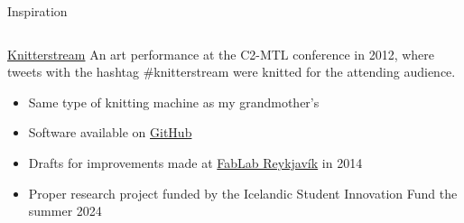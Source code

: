 \documentclass[
    NAME={Dr. Helga Ingimundardóttir},
    EMAIL={helgaingim@hi.is},
    FACULTY={Industrial Engineering},
    TITLE={HiDef Textiles: Reviving Tradition with Innovation},
    SUBTITLE={Empowering Creativity and Sustainability in Textile Production through Digital Transformation},
    SEMINAR={Reykjavík DataBeers},
    DATE={January 25, 2025},
    WIDE={true}
]{HI-LaTeX/hi-beamer}
\begin{document}
\begin{frame}{Inspiration}

\begin{columns}
    \begin{column}{0.65\textwidth}
\begin{alertblock}{\href{https://vimeo.com/58580261}{Knitterstream}}
An art performance at the \alert{C2-MTL} conference in 2012, where tweets with the hashtag \alert{\#knitterstream} were knitted for the attending audience.
\end{alertblock}

\begin{itemize}
    \item Same type of knitting machine as my grandmother's
    \item Software available on \href{https://github.com/borgstrom/KnitterStream/tree/master}{GitHub} 
    \item Drafts for improvements made at \href{https://web.archive.org/web/20150918225135/http://wiki.fablab.is/wiki/HiKnitterStream}{FabLab Reykjavík} in 2014
    \item Proper research project funded by the \alert{Icelandic Student Innovation Fund} the summer 2024
\end{itemize}


\end{column}
\end{columns}
\end{frame}
\end{document}
